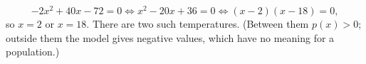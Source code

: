 \[-2x^2+40x-72=0\iff x^2-20x+36=0\iff(x-2)(x-18)=0,\]
so $x=\boxed{2}$ or $x=\boxed{18}$. There are two such temperatures. (Between them $p(x)>0$; outside them the model gives negative values, which have no meaning for a population.)
